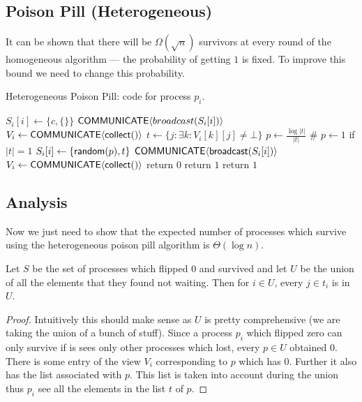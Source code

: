 \documentclass[
10pt, %
a4paper, %
onecolumn, %
]{article}
\begin{document}
\subsection{Poison Pill (Heterogeneous)}
It can be shown that there will be $\Omega(\sqrt{n})$ survivors at every round of the homogeneous algorithm --- the probability of getting $1$ is fixed. To improve this bound we need to change this probability. 
\begin{algorithm}
	\caption{Heterogeneous Poison Pill: code for process $p_i$.}
    \label{pseudocode:hetPP}
    \begin{algorithmic}[1]
	\State $S_i[i] \leftarrow \{c, \{\}\}$
	\State $\mathsf{COMMUNICATE}\langle broadcast(S_i[i])\rangle$
	\State $V_i \leftarrow \mathsf{COMMUNICATE}\langle\mathsf{collect}()\rangle$
	\State $t \leftarrow \{j: \exists k: V_i[k][j] \neq \bot\}$
	\State $p \leftarrow \frac{\log |t|}{|t|}$ \# $p \leftarrow 1$ if $|t| = 1$
	\State $S_i[i] \leftarrow \left\{\mathsf{random}(p), t\right\}$
	\State $\mathsf{COMMUNICATE}\langle\mathsf{broadcast}(S_i[i])\rangle$
	\State $V_i \leftarrow \mathsf{COMMUNICATE}\langle\mathsf{collect}()\rangle$
		\State return $0$
	\Else
		\State return $1$
	\EndIf
	\State return $1$
	\end{algorithmic}
\end{algorithm}

\subsection{Analysis}
Now we just need to show that the expected number of processes which survive using the heterogeneous poison pill algorithm is $\Theta(\log n)$. 

\begin{claim}
\label{claim:closure} Let $S$ be the set of processes which flipped $0$ and survived and let $U$ be the union of all the elements that they found not waiting. Then for $i \in U$, every $j \in t_i$ is in $U$.   
\end{claim}
\begin{proof}
Intuitively this should make sense as $U$ is pretty comprehensive (we are taking the union of a bunch of stuff). Since a process $p_i$ which flipped zero can only survive if is sees only other processes which lost, every $p \in U$ obtained $0$. There is some entry of the view $V_i$ corresponding to $p$ which has $0$. Further it also has the list associated with $p$. This list is taken into account during the union thus $p_i$ see all the elements in the list $t$ of $p$.
\end{proof}
\end{document}
